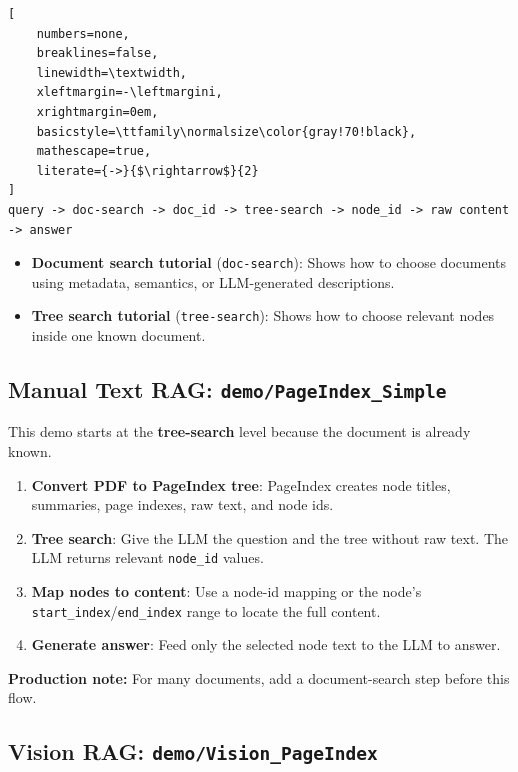 \documentclass[11pt,a4paper]{article}
\newcommand{\fieldname}[1]{\textcolor{red!70!black}{\texttt{#1}}}
\begin{document}
\begin{lstlisting}[
    numbers=none,
    breaklines=false,
    linewidth=\textwidth,
    xleftmargin=-\leftmargini,
    xrightmargin=0em,
    basicstyle=\ttfamily\normalsize\color{gray!70!black},
    mathescape=true,
    literate={->}{$\rightarrow$}{2}
]
query -> doc-search -> doc_id -> tree-search -> node_id -> raw content -> answer
\end{lstlisting}

\begin{itemize}
    \item \textbf{Document search tutorial} (\texttt{doc-search}): Shows how to choose documents using metadata, semantics, or LLM-generated descriptions.
    \item \textbf{Tree search tutorial} (\texttt{tree-search}): Shows how to choose relevant nodes inside one known document.
\end{itemize}

\subsection{Manual Text RAG: \texttt{demo/PageIndex\_Simple}}

This demo starts at the \textbf{tree-search} level because the document is already known.

\begin{enumerate}
    \item \textbf{Convert PDF to PageIndex tree}: PageIndex creates node titles, summaries, page indexes, raw text, and node ids.
    \item \textbf{Tree search}: Give the LLM the question and the tree without raw text. The LLM returns relevant \fieldname{node\_id} values.
    \item \textbf{Map nodes to content}: Use a node-id mapping or the node's \fieldname{start\_index}/\fieldname{end\_index} range to locate the full content.
    \item \textbf{Generate answer}: Feed only the selected node text to the LLM to answer.
\end{enumerate}

\noindent\textbf{Production note:} For many documents, add a document-search step before this flow.

\subsection{Vision RAG: \texttt{demo/Vision\_PageIndex}}
\end{document}
